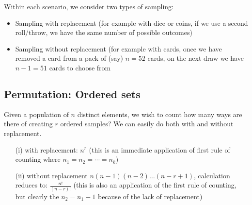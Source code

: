 \documentclass[12pt]{extbook}
\begin{document}
Within each scenario, we consider two types of sampling:
\begin{itemize}
\item Sampling with replacement (for example with dice or coins, if we use a second roll/throw, we have the same number of possible outcomes)
\item Sampling without replacement (for example with cards, once we have removed a card from a pack of (say) $n=52$ cards, on the next draw we have $n-1=51$ cards to choose from
\end{itemize}



 





 


\subsection{Permutation: Ordered sets}



Given a population of $n$ distinct elements, we wish to count how many ways are there of creating $r$ ordered samples?   We can easily do both with and without replacement.

\begin{itemize}
\item[(i)] with replacement: $n^r$ (this is an immediate application of first rule of counting where $n_1=n_2=\cdots=n_k$)
\item[(ii)] without replacement $n(n-1)(n-2)\ldots(n-r+1)$,  calculation reduces to: $\frac{n!}{(n-r)!}$ (this is also an application of the first rule of counting, but clearly the $n_2=n_1-1$ because of the lack of replacement)
\end{itemize}
\end{document}
